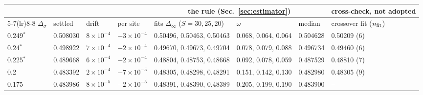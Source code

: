 \begin{tabular}{@{}llllllll@{}}
\toprule
 & & & & \multicolumn{3}{c}{the rule (Sec.~\ref{sec:estimator})} & cross-check, not adopted\\
\cmidrule(lr){5-7}\cmidrule(lr){8-8}
$\Delta_\sigma$ & settled & drift & per site & fits $\Delta_\infty$ ($S=30,25,20$) & $\omega$ & median & crossover fit ($n_{\rm fit}$)\\
\midrule
0.249$^\ast$ & 0.508030 & $8\times10^{-4}$ & $-3\times10^{-4}$ & 0.50496, 0.50463, 0.50463 & 0.068, 0.064, 0.064 & 0.504628 & 0.50209 (6)\\
0.24$^\ast$ & 0.498922 & $7\times10^{-4}$ & $-2\times10^{-4}$ & 0.49670, 0.49673, 0.49704 & 0.078, 0.079, 0.088 & 0.496734 & 0.49460 (6)\\
0.225$^\ast$ & 0.489668 & $6\times10^{-4}$ & $-2\times10^{-4}$ & 0.48804, 0.48753, 0.48668 & 0.092, 0.078, 0.059 & 0.487529 & 0.48810 (7)\\
0.2 & 0.483392 & $2\times10^{-4}$ & $-7\times10^{-5}$ & 0.48305, 0.48298, 0.48291 & 0.151, 0.142, 0.130 & 0.482980 & 0.48305 (9)\\
0.175 & 0.483986 & $8\times10^{-5}$ & $-2\times10^{-5}$ & 0.48391, 0.48390, 0.48389 & 0.205, 0.199, 0.190 & 0.483900 & --\\
\bottomrule
\end{tabular}
